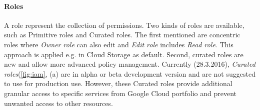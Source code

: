 \documentclass[a4paper,12pt,oneside]{report}
\begin{document}
	\paragraph{Roles} A role represent the collection of permissions. Two kinds of
	roles 
	are available, such as Primitive roles and Curated roles. The first mentioned
	are concentric 
	roles where \textit{Owner role} can also edit and \textit{Edit role} includes 
	\textit{Read role}. This approach is applied e.g. in Cloud Storage as default.
	Second, 
	curated roles are new and allow more advanced policy management. 
	Currently (28.3.2016), \textit{Curated roles}(\ref{fig:iam}, (a) are in alpha or
	beta 
	development version and are not suggested to use for production 
	use. However, these Curated roles provide additional granular access to specific
	services 
	from Google Cloud portfolio and prevent unwanted access to 
	other resources. 
\end{document}
